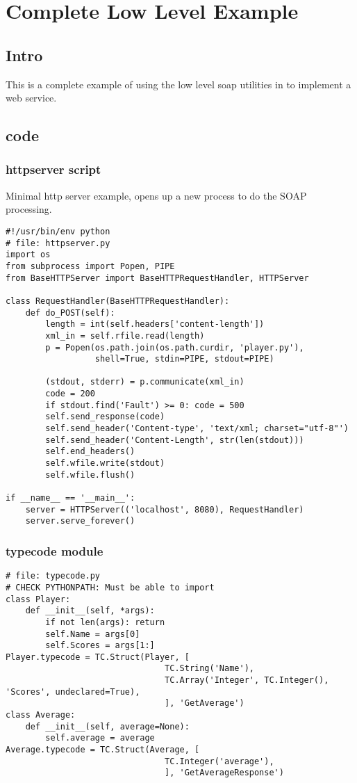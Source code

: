 \chapter{Complete Low Level Example}

\section{Intro} This is a complete example of using the low level soap utilities
in \ZSI{} to implement a web service.

\section{code}
\subsection{httpserver script} Minimal http server example, opens up a new
process to do the SOAP processing.
\begin{verbatim}
#!/usr/bin/env python
# file: httpserver.py
import os
from subprocess import Popen, PIPE
from BaseHTTPServer import BaseHTTPRequestHandler, HTTPServer

class RequestHandler(BaseHTTPRequestHandler):
    def do_POST(self):
        length = int(self.headers['content-length'])
        xml_in = self.rfile.read(length)
        p = Popen(os.path.join(os.path.curdir, 'player.py'),
                  shell=True, stdin=PIPE, stdout=PIPE)

        (stdout, stderr) = p.communicate(xml_in)
        code = 200
        if stdout.find('Fault') >= 0: code = 500 
        self.send_response(code)
        self.send_header('Content-type', 'text/xml; charset="utf-8"')
        self.send_header('Content-Length', str(len(stdout)))
        self.end_headers()
        self.wfile.write(stdout)
        self.wfile.flush()

if __name__ == '__main__':
    server = HTTPServer(('localhost', 8080), RequestHandler)
    server.serve_forever()
\end{verbatim}

\subsection{typecode module}
\begin{verbatim}
# file: typecode.py
# CHECK PYTHONPATH: Must be able to import
class Player:
    def __init__(self, *args):
        if not len(args): return
        self.Name = args[0]
        self.Scores = args[1:]
Player.typecode = TC.Struct(Player, [
                                TC.String('Name'),
                                TC.Array('Integer', TC.Integer(), 'Scores', undeclared=True),
                                ], 'GetAverage')
class Average:
    def __init__(self, average=None):
        self.average = average
Average.typecode = TC.Struct(Average, [
                                TC.Integer('average'),
                                ], 'GetAverageResponse')
\end{verbatim}                          
